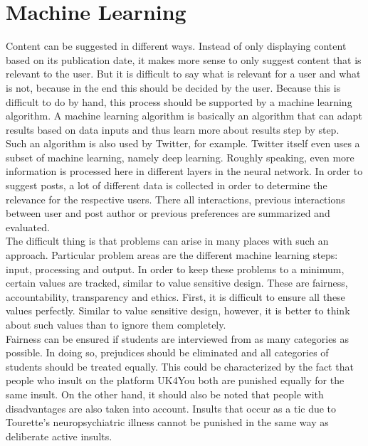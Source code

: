 \section{Machine Learning}\label{sec:ai}
Content can be suggested in different ways.
Instead of only displaying content based on its publication date, it makes more sense to only suggest content that is relevant to the user.
But it is difficult to say what is relevant for a user and what is not, because in the end this should be decided by the user.
Because this is difficult to do by hand, this process should be supported by a machine learning algorithm.
A machine learning algorithm is basically an algorithm that can adapt results based on data inputs and thus learn more about results step by step.\\

Such an algorithm is also used by Twitter, for example\cite{twitter-deep-learning}.
Twitter itself even uses a subset of machine learning, namely deep learning.
Roughly speaking, even more information is processed here in different layers in the neural network.
In order to suggest posts, a lot of different data is collected in order to determine the relevance for the respective users.
There all interactions, previous interactions between user and post author or previous preferences are summarized and evaluated.\\

The difficult thing is that problems can arise in many places with such an approach.
Particular problem areas are the different machine learning steps: input, processing and output.
In order to keep these problems to a minimum, certain values are tracked, similar to value sensitive design.
These are fairness, accountability, transparency and ethics.
First, it is difficult to ensure all these values perfectly.
Similar to value sensitive design, however, it is better to think about such values than to ignore them completely.\\

Fairness can be ensured if students are interviewed from as many categories as possible.
In doing so, prejudices should be eliminated and all categories of students should be treated equally.
This could be characterized by the fact that people who insult on the platform UK4You both are punished equally for the same insult.
On the other hand, it should also be noted that people with disadvantages are also taken into account.
Insults that occur as a tic due to Tourette's neuropsychiatric illness cannot be punished in the same way as deliberate active insults.\\

